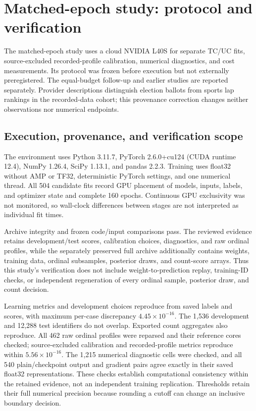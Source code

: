 \section{Matched-epoch study: protocol and verification}\label{app:ibm-gpu}
The matched-epoch study uses a cloud NVIDIA L40S for separate TC/UC fits, source-excluded recorded-profile calibration, numerical diagnostics, and cost measurements. Its protocol was frozen before execution but not externally preregistered. %
The equal-budget follow-up and earlier studies are reported separately. Provider descriptions distinguish election ballots from sports lap rankings in the recorded-data cohort; this provenance correction changes neither observations nor numerical endpoints.

\subsection{Execution, provenance, and verification scope}
The environment uses Python 3.11.7, PyTorch 2.6.0+cu124 (CUDA runtime 12.4), NumPy 1.26.4, SciPy 1.13.1, and pandas 2.2.3. Training uses float32 without AMP or TF32, deterministic PyTorch settings, and one numerical thread. All 504 candidate fits record GPU placement of models, inputs, labels, and optimizer state and complete 160 epochs. Continuous GPU exclusivity was not monitored, so wall-clock differences between stages are not interpreted as individual fit times.

Archive integrity and frozen code/input comparisons pass. The reviewed evidence retains development/test scores, calibration choices, diagnostics, and raw ordinal profiles, while the separately preserved full archive additionally contains weights, training data, ordinal subsamples, posterior draws, and count-score arrays. Thus this study's verification does not include weight-to-prediction replay, training-ID checks, or independent regeneration of every ordinal sample, posterior draw, and count decision.

Learning metrics and development choices reproduce from saved labels and scores, with maximum per-case discrepancy $4.45\times10^{-16}$. The 1,536 development and 12,288 test identifiers do not overlap. Exported count aggregates also reproduce. All 462 raw ordinal profiles were reparsed and their reference cores checked; source-excluded calibration and recorded-profile metrics reproduce within $5.56\times10^{-16}$. The 1,215 numerical diagnostic cells were checked, and all 540 plain/checkpoint output and gradient pairs agree exactly in their saved float32 representations. These checks establish computational consistency within the retained evidence, not an independent training replication. Thresholds retain their full numerical precision because rounding a cutoff can change an inclusive boundary decision.

